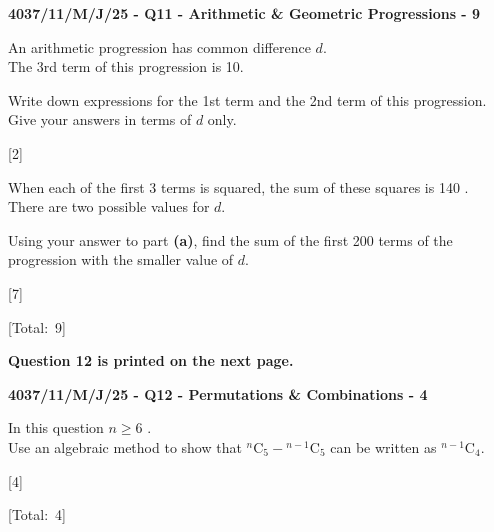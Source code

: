 \documentclass[11pt,a4paper]{article}
\newcommand{\swmarks}{}
\newcommand{\examq}[4]{%
  \gdef\swmarks{#4}%
  \par\addvspace{16pt}\noindent
  {\large\bfseries #1 - Q#2 - #3 - #4}\par\vspace{5pt}%
}
\newcommand{\total}{\par\vspace{2mm}\noindent\hspace*{\fill}[Total:\ \swmarks]\par\vspace{2mm}}
\renewcommand{\markright}[1]{\par\nopagebreak\noindent\hspace*{\fill}\mbox{#1}\par\vspace{1mm}}
\begin{document}
\examq{4037/11/M/J/25}{11}{Arithmetic \& Geometric Progressions}{9}
An arithmetic progression has common difference $d$.\\
The 3rd term of this progression is 10.
\begin{parts}
  \item Write down expressions for the 1st term and the 2nd term of this progression.\\
  Give your answers in terms of $d$ only.
  \markright{[2]}
  \vspace{5cm}

  \item When each of the first 3 terms is squared, the sum of these squares is 140 .\\
  There are two possible values for $d$.

  Using your answer to part \textbf{(a)}, find the sum of the first 200 terms of the progression with the smaller value of $d$.
  \markright{[7]}
  \vspace{12cm}
\end{parts}
\total

\begin{center}\textbf{Question 12 is printed on the next page.}\end{center}

\examq{4037/11/M/J/25}{12}{Permutations \& Combinations}{4}
In this question $n\geqslant 6$ .\\
Use an algebraic method to show that $^{n}\mathrm{C}_{5}-{}^{n-1}\mathrm{C}_{5}$ can be written as $^{n-1}\mathrm{C}_{4}$.
\markright{[4]}
\vspace{12cm}
\total
\end{document}
